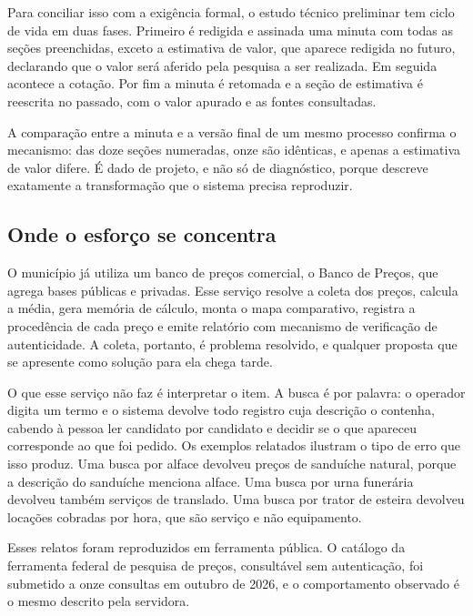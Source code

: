 Para conciliar isso com a exigência formal, o estudo técnico preliminar tem
ciclo de vida em duas fases. Primeiro é redigida e assinada uma minuta com todas
as seções preenchidas, exceto a estimativa de valor, que aparece redigida no
futuro, declarando que o valor será aferido pela pesquisa a ser realizada. Em
seguida acontece a cotação. Por fim a minuta é retomada e a seção de estimativa
é reescrita no passado, com o valor apurado e as fontes consultadas.

A comparação entre a minuta e a versão final de um mesmo processo confirma o
mecanismo: das doze seções numeradas, onze são idênticas, e apenas a estimativa
de valor difere. É dado de projeto, e não só de diagnóstico, porque descreve
exatamente a transformação que o sistema precisa reproduzir.

\subsection{Onde o esforço se concentra}
\label{subsec:onde-doi}

O município já utiliza um banco de preços comercial, o Banco de Preços, que
agrega bases públicas e privadas. Esse serviço resolve a coleta dos preços,
calcula a média, gera memória de cálculo, monta o mapa comparativo, registra a
procedência de cada preço e emite relatório com mecanismo de verificação de
autenticidade. A coleta, portanto, é problema resolvido, e qualquer proposta que
se apresente como solução para ela chega tarde.

O que esse serviço não faz é interpretar o item. A busca é por palavra: o
operador digita um termo e o sistema devolve todo registro cuja descrição o
contenha, cabendo à pessoa ler candidato por candidato e decidir se o que
apareceu corresponde ao que foi pedido. Os exemplos relatados ilustram o tipo de
erro que isso produz. Uma busca por alface devolveu preços de sanduíche natural,
porque a descrição do sanduíche menciona alface. Uma busca por urna funerária
devolveu também serviços de translado. Uma busca por trator de esteira devolveu
locações cobradas por hora, que são serviço e não equipamento.

Esses relatos foram reproduzidos em ferramenta pública. O catálogo da
ferramenta federal de pesquisa de preços, consultável sem autenticação, foi
submetido a onze consultas em outubro de 2026, e o comportamento observado é o
mesmo descrito pela servidora.

